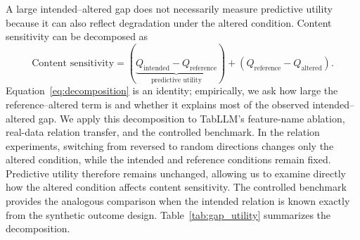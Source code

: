 \documentclass{article} %
\begin{document}
A large intended--altered gap does not necessarily measure predictive utility because it can also reflect degradation under the altered condition.
Content sensitivity can be decomposed as
\begin{equation}
\text{Content sensitivity} =
(\underbrace{ Q_{\mathrm{intended}}-Q_{\mathrm{reference}}}_{\text{predictive utility}})
+
(Q_{\mathrm{reference}}-Q_{\mathrm{altered}}).
\label{eq:decomposition}
\end{equation}
Equation~\ref{eq:decomposition} is an identity; empirically, we ask how large the reference--altered term is and whether it explains most of the observed intended--altered gap.
We apply this decomposition to TabLLM's feature-name ablation, real-data relation transfer, and the controlled benchmark.
In the relation experiments, switching from reversed to random directions changes only the altered condition, while the intended and reference conditions remain fixed.
Predictive utility therefore remains unchanged, allowing us to examine directly how the altered condition affects content sensitivity.
The controlled benchmark provides the analogous comparison when the intended relation is known exactly from the synthetic outcome design.
Table~\ref{tab:gap_utility} summarizes the decomposition.
\end{document}
